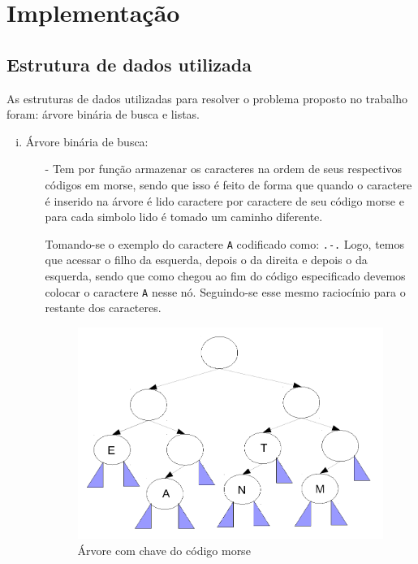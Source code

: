 \documentclass[12 pt, a4paper]{article}
\begin{document}
\newpage
\section {Implementa\c{c}\~ao}

\subsection{Estrutura de dados utilizada}

As estruturas de dados utilizadas para resolver o problema proposto no trabalho foram: \'arvore bin\'aria de busca e listas. 

\begin{enumerate}[(i)]
	\item \'Arvore bin\'aria de busca:
	\begin{itemize}
	\item[-] Tem por fun\c{c}\~ao armazenar os caracteres na ordem de seus respectivos c\'odigos em morse, sendo que isso \'e feito de forma que quando o caractere \'e inserido na \'arvore \'e lido caractere por caractere de seu c\'odigo morse e para cada simbolo lido \'e tomado um caminho diferente. 
    

    Tomando-se o exemplo do caractere \texttt{A} codificado como: \texttt{.-.}
    \newline
    Logo, temos que acessar o filho da esquerda, depois o da direita e depois o da esquerda, sendo que como chegou ao fim do c\'odigo especificado devemos colocar o caractere \texttt{A} nesse n\'o. Seguindo-se esse mesmo racioc\'inio para o restante dos caracteres.
    \begin{figure}[H]
        \centering
        \includegraphics[scale = 0.4]{images/arvore}
        \caption{\'Arvore com chave do código morse}
        \label{arvore}
    \end{figure}
	\end{itemize}


\end{enumerate}
\end{document}
